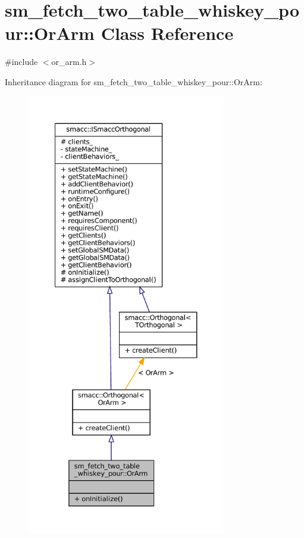 \hypertarget{classsm__fetch__two__table__whiskey__pour_1_1OrArm}{}\section{sm\+\_\+fetch\+\_\+two\+\_\+table\+\_\+whiskey\+\_\+pour\+:\+:Or\+Arm Class Reference}
\label{classsm__fetch__two__table__whiskey__pour_1_1OrArm}


{\ttfamily \#include $<$or\+\_\+arm.\+h$>$}



Inheritance diagram for sm\+\_\+fetch\+\_\+two\+\_\+table\+\_\+whiskey\+\_\+pour\+:\+:Or\+Arm\+:
\nopagebreak
\begin{figure}[H]
\begin{center}
\leavevmode
\includegraphics[height=550pt]{classsm__fetch__two__table__whiskey__pour_1_1OrArm__inherit__graph}
\end{center}
\end{figure}


